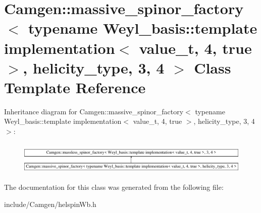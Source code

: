 \hypertarget{a00348}{\section{Camgen\-:\-:massive\-\_\-spinor\-\_\-factory$<$ typename Weyl\-\_\-basis\-:\-:template implementation$<$ value\-\_\-t, 4, true $>$, helicity\-\_\-type, 3, 4 $>$ Class Template Reference}
\label{a00348}
}
Inheritance diagram for Camgen\-:\-:massive\-\_\-spinor\-\_\-factory$<$ typename Weyl\-\_\-basis\-:\-:template implementation$<$ value\-\_\-t, 4, true $>$, helicity\-\_\-type, 3, 4 $>$\-:\begin{figure}[H]
\begin{center}
\leavevmode
\includegraphics[height=1.564246cm]{a00348}
\end{center}
\end{figure}


The documentation for this class was generated from the following file\-:\begin{DoxyCompactItemize}
\item 
include/\-Camgen/helspin\-Wb.\-h\end{DoxyCompactItemize}
